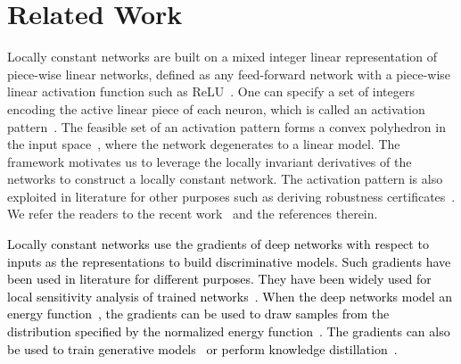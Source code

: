 \documentclass{article} \usepackage{iclr2020_conference,times}
\newcommand{\camera}[1]{\textcolor{black}{#1}}
\begin{document}
\iffalse In summary, our main contributions are as follows:
\vspace{-2mm}
\begin{itemize}[leftmargin=4mm]
\item Flexible neural models that entail locally constant mappings and enable novel extensions. 
\vspace{-1mm}
\item Theoretical analyses that illuminate the properties of locally constant networks. 
\vspace{-1mm}
\item Empirical demonstration of the state-of-the-art optimization and generalization performance. 
\vspace{-2mm}
\end{itemize}
\fi












%
 \vspace{-1mm}
\section{Related Work}
\vspace{-1mm}
Locally constant networks are built on a mixed integer linear representation of piece-wise linear networks, defined as any feed-forward network with a piece-wise linear activation function such as ReLU~\citep{nair2010rectified}. One can specify a set of integers encoding the active linear piece of each neuron, which is called an activation pattern~\citep{raghu2017expressive}. The feasible set of an activation pattern forms a convex polyhedron in the input space~\citep{lee2018towards}, where the network degenerates to a linear model. The framework motivates us to leverage the locally invariant derivatives of the networks to construct a locally constant network. The activation pattern is also exploited in literature for other purposes such as 
deriving robustness certificates~\citep{weng2018towards}. We refer the readers to the recent work~\citep{lee2018towards} and the references therein. 

\camera{Locally constant networks use the gradients of deep networks with respect to inputs as the representations to build discriminative models. Such gradients have been used in literature for different purposes. They have been widely used for local sensitivity analysis of trained networks~\citep{simonyan2013deep, smilkov2017smoothgrad}. When the deep networks model an energy function~\citep{lecun2006tutorial}, the gradients can be used to draw samples from the distribution specified by the normalized energy function~\citep{du2019implicit, song2019generative}. The gradients can also be used to train generative models~\citep{goodfellow2014generative} or perform knowledge distillation~\citep{pmlr-v80-srinivas18a}.}
\end{document}
